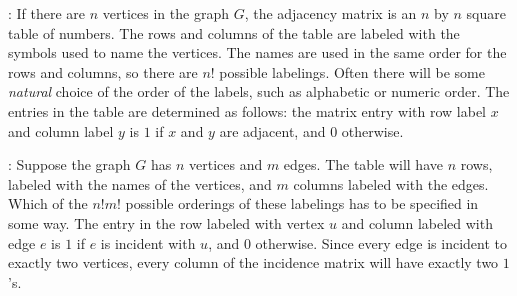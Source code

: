 {}: If there are $n$ vertices in the graph $G$, the adjacency matrix is an $n$ by $n$ square table of numbers. The rows and columns of the table are labeled with the symbols used to name the vertices. The names are used in the same order for the rows and columns, so there are $n!$ possible labelings. Often there will be some {\it natural} choice of the order of the labels, such as alphabetic or numeric order. The entries in the table are determined as follows: the matrix entry with row label $x$ and column label $y$ is $1$ if $x$ and $y$ are adjacent, and $0$ otherwise. 


{}: Suppose the graph $G$ has $n$ vertices and $m$ edges. The table 
will have $n$ rows, labeled with the names of the vertices,  and $m$ columns labeled with the edges. Which of the $n!m!$ possible orderings of these labelings has to be specified in some way.  The entry in the row labeled with vertex 
$u$ and column labeled with edge $e$ is $1$ if $e$ is incident with $u$, and $0$ otherwise. Since every edge is incident to exactly two vertices, every column of the incidence matrix will have exactly two $1$'s.


